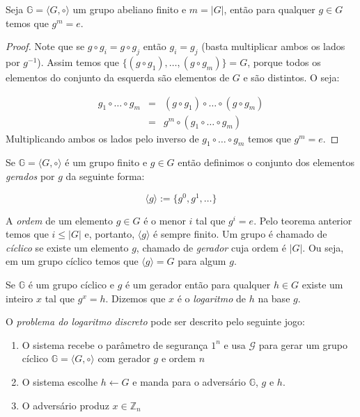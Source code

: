 \begin{theorem}
  Seja $\mathbb{G} = \langle G, \circ \rangle$ um grupo abeliano finito e $m = |G|$, então para qualquer $g \in G$ temos que $g^m = e$.
\end{theorem}
\begin{proof}
  Note que se $g \circ g_i = g \circ g_j$ então $g_i = g_j$ (basta multiplicar ambos os lados por $g^{-1}$).
  Assim temos que $\{(g \circ g_1), \dots, (g \circ g_m)\} = G$, porque todos os elementos do conjunto da esquerda são elementos de $G$ e são distintos.
  O seja:
  
  \begin{eqnarray*}
    g_1 \circ \dots \circ g_m & = & (g \circ g_1) \circ \dots \circ (g \circ g_m)\\
                              & = & g^m \circ (g_1 \circ \dots \circ g_m)
  \end{eqnarray*}
  Multiplicando ambos os lados pelo inverso de $g_1 \circ \dots \circ g_m$ temos que $g^m = e$.
\end{proof}

Se $\mathbb{G} = \langle G, \circ \rangle$ é um grupo finito e $g \in G$ então definimos o conjunto dos elementos {\em gerados} por $g$ da seguinte forma:

\begin{displaymath}
  \langle g \rangle := \{g^0, g^1, \dots \}
\end{displaymath}

A {\em ordem} de um elemento $g \in G$ é o menor $i$ tal que $g^i = e$.
Pelo teorema anterior temos que $i \leq |G|$ e, portanto, $\langle g \rangle$ é sempre finito.
Um grupo é chamado de {\em cíclico} se existe um elemento $g$, chamado de {\em gerador} cuja ordem é $|G|$.
Ou seja, em um grupo cíclico temos que $\langle g \rangle = G$ para algum $g$.

Se $\mathbb{G}$ é um grupo cíclico e $g$ é um gerador então para qualquer $h \in G$ existe um inteiro $x$ tal que $g^x = h$.
Dizemos que $x$ é o {\em logaritmo} de $h$ na base $g$.

O {\em problema do logaritmo discreto} pode ser descrito pelo seguinte jogo:
\begin{enumerate}
\item O sistema recebe o parâmetro de segurança $1^n$ e usa $\mathcal{G}$ para gerar um grupo cíclico $\mathbb{G} = \langle G, \circ \rangle$ com gerador $g$ e ordem $n$
\item O sistema escolhe $h \leftarrow G$ e manda para o adversário $\mathbb{G}$, $g$ e $h$. 
\item O adversário produz $x \in \mathbb{Z}_n$
\end{enumerate}

